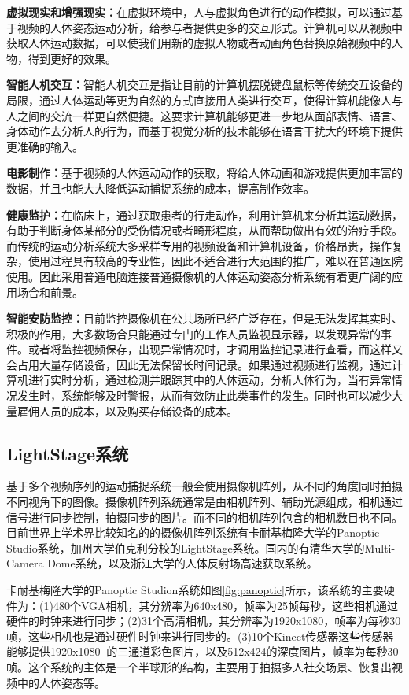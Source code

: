 \textbf{虚拟现实和增强现实：}在虚拟环境中，人与虚拟角色进行的动作模拟，可以通过基于视频的人体姿态运动分析，给参与者提供更多的交互形式。计算机可以从视频中获取人体运动数据，可以使我们用新的虚拟人物或者动画角色替换原始视频中的人物，得到更好的效果。

\textbf{智能人机交互：}智能人机交互是指让目前的计算机摆脱键盘鼠标等传统交互设备的局限，通过人体运动等更为自然的方式直接用人类进行交互，使得计算机能像人与人之间的交流一样更自然便捷。这要求计算机能够更进一步地从面部表情、语言、身体动作去分析人的行为，而基于视觉分析的技术能够在语言干扰大的环境下提供更准确的输入。

\textbf{电影制作：}基于视频的人体运动动作的获取，将给人体动画和游戏提供更加丰富的数据，并且也能大大降低运动捕捉系统的成本，提高制作效率。

\textbf{健康监护：}在临床上，通过获取患者的行走动作，利用计算机来分析其运动数据，有助于判断身体某部分的受伤情况或者畸形程度，从而帮助做出有效的治疗手段。而传统的运动分析系统大多采样专用的视频设备和计算机设备，价格昂贵，操作复杂，使用过程具有较高的专业性，因此不适合进行大范围的推广，难以在普通医院使用。因此采用普通电脑连接普通摄像机的人体运动姿态分析系统有着更广阔的应用场合和前景。

\textbf{智能安防监控：}目前监控摄像机在公共场所已经广泛存在，但是无法发挥其实时、积极的作用，大多数场合只能通过专门的工作人员监视显示器，以发现异常的事件。或者将监控视频保存，出现异常情况时，才调用监控记录进行查看，而这样又会占用大量存储设备，因此无法保留长时间记录。如果通过视频进行监视，通过计算机进行实时分析，通过检测并跟踪其中的人体运动，分析人体行为，当有异常情况发生时，系统能够及时警报，从而有效防止此类事件的发生。同时也可以减少大量雇佣人员的成本，以及购买存储设备的成本。

\subsection{LightStage系统}
基于多个视频序列的运动捕捉系统一般会使用摄像机阵列，从不同的角度同时拍摄不同视角下的图像。摄像机阵列系统通常是由相机阵列、辅助光源组成，相机通过信号进行同步控制，拍摄同步的图片。而不同的相机阵列包含的相机数目也不同。目前世界上学术界比较知名的的摄像机阵列系统有卡耐基梅隆大学的Panoptic Studio系统，加州大学伯克利分校的LightStage系统。国内的有清华大学的Multi-Camera Dome系统，以及浙江大学的人体反射场高速获取系统。

卡耐基梅隆大学的Panoptic Studion系统\cite{Panoptic}如图\ref{fig:panoptic}所示，该系统的主要硬件为：(1)480个VGA相机，其分辨率为640x480，帧率为25帧每秒，这些相机通过硬件的时钟来进行同步；(2)31个高清相机，其分辨率为1920x1080，帧率为每秒30帧，这些相机也是通过硬件时钟来进行同步的。(3)10个Kinect传感器这些传感器能够提供1920x1080的三通道彩色图片，以及512x424的深度图片，帧率为每秒30帧。这个系统的主体是一个半球形的结构，主要用于拍摄多人社交场景、恢复出视频中的人体姿态等。

